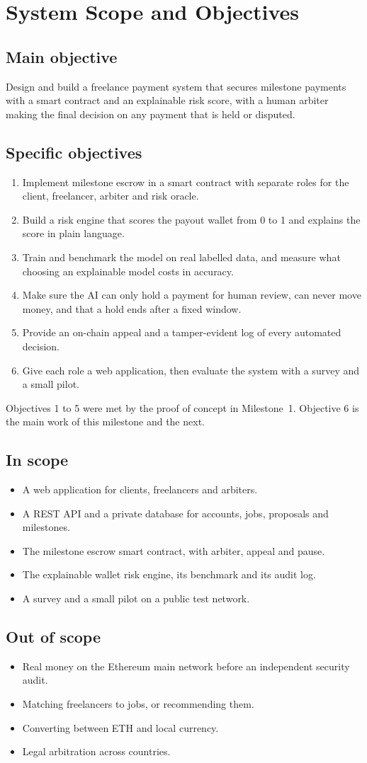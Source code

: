 \chapter{System Scope and Objectives}
\label{ch:scope}

\section{Main objective}
Design and build a freelance payment system that secures milestone payments with a smart contract and an explainable risk score, with a human arbiter making the final decision on any payment that is held or disputed.

\section{Specific objectives}
\begin{enumerate}
\item Implement milestone escrow in a smart contract with separate roles for the client, freelancer, arbiter and risk oracle.
\item Build a risk engine that scores the payout wallet from 0 to 1 and explains the score in plain language.
\item Train and benchmark the model on real labelled data, and measure what choosing an explainable model costs in accuracy.
\item Make sure the AI can only hold a payment for human review, can never move money, and that a hold ends after a fixed window.
\item Provide an on-chain appeal and a tamper-evident log of every automated decision.
\item Give each role a web application, then evaluate the system with a survey and a small pilot.
\end{enumerate}
Objectives 1 to 5 were met by the proof of concept in Milestone~1. Objective 6 is the main work of this milestone and the next.

\section{In scope}
\begin{itemize}
\item A web application for clients, freelancers and arbiters.
\item A REST API and a private database for accounts, jobs, proposals and milestones.
\item The milestone escrow smart contract, with arbiter, appeal and pause.
\item The explainable wallet risk engine, its benchmark and its audit log.
\item A survey and a small pilot on a public test network.
\end{itemize}

\section{Out of scope}
\begin{itemize}
\item Real money on the Ethereum main network before an independent security audit.
\item Matching freelancers to jobs, or recommending them.
\item Converting between ETH and local currency.
\item Legal arbitration across countries.
\end{itemize}
